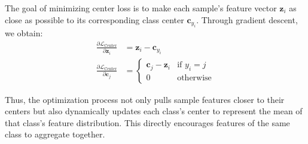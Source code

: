 The goal of minimizing center loss is to make each sample's feature vector $\mathbf{z}_i$ as close as possible to its corresponding class center $\mathbf{c}_{y_i}$. Through gradient descent, we obtain:
\begin{align}
\frac{\partial \mathcal{L}_{\text{Center}}}{\partial \mathbf{z}_i} &= \mathbf{z}_i - \mathbf{c}_{y_i} \\
\frac{\partial \mathcal{L}_{\text{Center}}}{\partial \mathbf{c}_j} &= \begin{cases}
\mathbf{c}_j - \mathbf{z}_i & \text{if } y_i = j \\
0 & \text{otherwise}
\end{cases}
\end{align}

Thus, the optimization process not only pulls sample features closer to their centers but also dynamically updates each class's center to represent the mean of that class's feature distribution. This directly encourages features of the same class to aggregate together.








